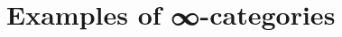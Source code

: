 \documentclass[a4paper]{amsart}
\numberwithin{figure}{section}
\theoremstyle{theorem}
\theoremstyle{definition}
\begin{document}
%
%
%
%
%
%
%
%
%
%

\section*{Examples of ∞-categories}
\end{document}
